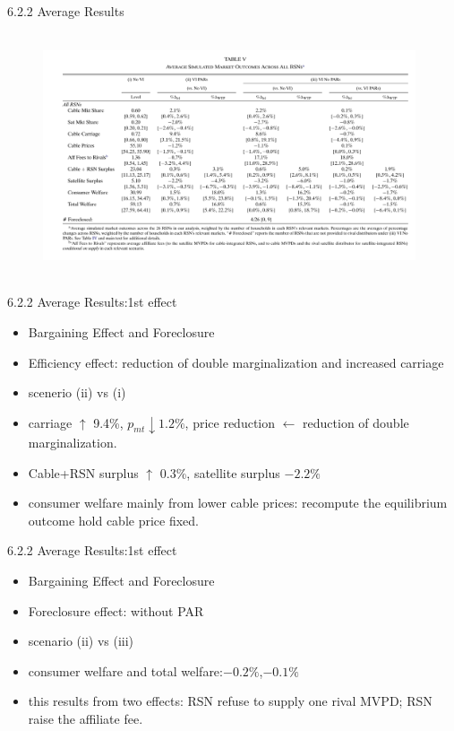 \documentclass[10pt]{beamer}
\begin{document}
\begin{frame}{6.2.2 Average Results}
    \begin{figure}
        \footnotesize
        \centering
        \includegraphics[height=7.2cm, width=11cm]{table5}
        \label{fig:my_label}
    \end{figure}
\end{frame}
\begin{frame}{6.2.2 Average Results:1st effect}
    \begin{itemize}
        \item Bargaining Effect and Foreclosure
        \item Efficiency effect: reduction of double marginalization and increased carriage
        \item scenerio (ii) vs (i)
        \item carriage $\uparrow$ 9.4\%, $p_{mt}\downarrow 1.2\%$, price reduction $\leftarrow$ reduction of double marginalization. 
        \item Cable+RSN surplus $\uparrow$ 0.3\%, satellite surplus $-2.2\%$
        \item consumer welfare mainly from lower cable prices: recompute the equilibrium outcome hold cable price fixed.
    \end{itemize}
\end{frame}
\begin{frame}{6.2.2 Average Results:1st effect}
    \begin{itemize}
        \item Bargaining Effect and Foreclosure
        \item Foreclosure effect: without PAR
        \item scenario (ii) vs (iii)
        \item consumer welfare and total welfare:$-0.2\%$,$-0.1\%$
        \item this results from two effects: RSN refuse to supply one rival MVPD; RSN raise the affiliate fee.
    \end{itemize}
\end{frame}
\end{document}
